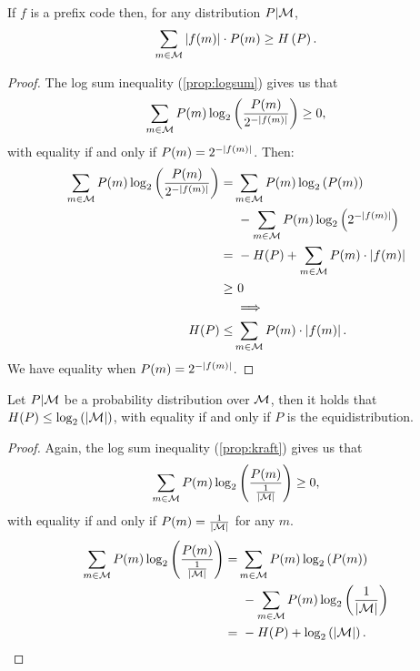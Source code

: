 \begin{prop} \label{prop:prefix-entropy-upper}
	If $f$ is a prefix code then, for any distribution $P|\mathcal{M}$,
	\begin{equation*}
		\sum_{m \in \mathcal{M}} \left|{f(m)}\right| \cdot P(m) \ge H\left({P}\right).
	\end{equation*}
\end{prop}

\begin{proof}
The log sum inequality (\cref{prop:logsum}) gives us that
\begin{equation*}
	\sum_{m \in \mathcal{M}} P(m) \log_2 \left( \frac{P(m)}{2^{-\left|{f(m)}\right|}} \right) \ge 0,
\end{equation*}
with equality if and only if $P(m) = 2^{-\left|{f(m)}\right|}$.
Then:
\begin{align*}
	\sum_{m \in \mathcal{M}} P(m) \log_2 \left( \frac{P(m)}{2^{-\left|{f(m)}\right|}} \right)
	= &
	\sum_{m \in \mathcal{M}} P(m) \log_2 \left( P(m) \right)
	\\
	&~-
	\sum_{m \in \mathcal{M}} P(m) \log_2 \left( 2^{-\left|{f(m)}\right|} \right)
	\\
	=
	&~-
	H(P) + \sum_{m \in \mathcal{M}} P(m) \cdot \left|{f(m)}\right|
	\\
	\ge &~0
	\\
	&
	\implies
	\\
	H(P)
	\le &
	\sum_{m \in \mathcal{M}} P(m) \cdot \left|{f(m)}\right|.
\end{align*}
We have equality when $P(m) = 2^{-\left|{f(m)}\right|}$.
\end{proof}

\begin{obs}
	Let $P|\mathcal{M}$ be a probability distribution over $\mathcal{M}$, then it holds that $H(P) \le \log_2 \left(\left|{\mathcal{M}}\right|\right)$, with equality if and only if $P$ is the equidistribution.
\end{obs}

\begin{proof}
	Again, the log sum inequality (\cref{prop:kraft}) gives us that
	\begin{equation*}
		\sum_{m \in \mathcal{M}} P(m) \log_2 \left( \frac{P(m)}{\frac{1}{\left|{\mathcal{M}}\right|}} \right) \ge 0,
	\end{equation*}
	with equality if and only if $P(m) = \frac{1}{\left|{\mathcal{M}}\right|}$ for any $m$.
	\begin{align*}
		\sum_{m \in \mathcal{M}} P(m) \log_2 \left( \frac{P(m)}{\frac{1}{\left|{\mathcal{M}}\right|}} \right)
		= &
		\sum_{m \in \mathcal{M}} P(m) \log_2 \left( P(m) \right)
		\\
		&~-
		\sum_{m \in \mathcal{M}} P(m) \log_2 \left( \frac{1}{\left|{\mathcal{M}}\right|} \right)
		\\
		=
		&~- H(P) + \log_2 \left( \left|{\mathcal{M}}\right| \right).
	\end{align*}
\end{proof}

